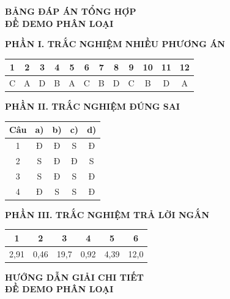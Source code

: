 \documentclass[12pt,a4paper]{article}
\begin{document}
\newpage
\begin{center}{\Large\textbf{BẢNG ĐÁP ÁN TỔNG HỢP}}\\[4pt]\textbf{ĐỀ DEMO PHÂN LOẠI}\end{center}
\textbf{PHẦN I. TRẮC NGHIỆM NHIỀU PHƯƠNG ÁN}
\begin{center}\renewcommand{\arraystretch}{1.5}\begin{tabular}{|*{12}{c|}}\hline
1 & 2 & 3 & 4 & 5 & 6 & 7 & 8 & 9 & 10 & 11 & 12\\\hline
C & A & D & B & A & C & B & D & C & B & D & A\\\hline
\end{tabular}\end{center}
\textbf{PHẦN II. TRẮC NGHIỆM ĐÚNG SAI}
\begin{center}\renewcommand{\arraystretch}{1.5}\begin{tabular}{|c|c|c|c|c|}\hline
Câu & a) & b) & c) & d)\\\hline
1 & Đ & Đ & S & Đ\\\hline
2 & S & Đ & Đ & S\\\hline
3 & S & Đ & S & Đ\\\hline
4 & Đ & S & S & Đ\\\hline
\end{tabular}\end{center}
\textbf{PHẦN III. TRẮC NGHIỆM TRẢ LỜI NGẮN}
\begin{center}\renewcommand{\arraystretch}{1.5}\begin{tabular}{|c|c|c|c|c|c|}\hline
1 & 2 & 3 & 4 & 5 & 6\\\hline
2,91 & 0,46 & 19,7 & 0,92 & 4,39 & 12,0\\\hline
\end{tabular}\end{center}

\newpage
\begin{center}{\Large\textbf{HƯỚNG DẪN GIẢI CHI TIẾT}}\\[4pt]\textbf{ĐỀ DEMO PHÂN LOẠI}\end{center}
\end{document}
